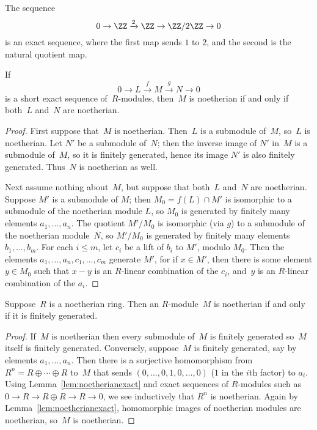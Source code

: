 \begin{example}
  The sequence
  \[
    0 \to \ZZ \xrightarrow{2} \ZZ\rightarrow \ZZ/2\ZZ \to 0
  \]
  is an exact sequence, where the first map sends $1$ to $2$,
  and the second is the natural quotient map.
\end{example}


\begin{lemma}\label{lem:noetherianexact}
  If
  \[
    0 \to L \xrightarrow{f} M \xrightarrow{g} N \to 0
  \]
  is a short exact sequence of~$R$-modules, then~$M$ is noetherian
  if and only if both~$L$ and~$N$ are noetherian.
\end{lemma}
\begin{proof}
  First suppose that~$M$ is noetherian.  Then~$L$ is a submodule
  of~$M$, so~$L$ is noetherian.  Let $N'$ be a submodule of~$N$;
  then the inverse image of $N'$ in~$M$ is a submodule of~$M$,
  so it is finitely generated, hence its image $N'$ is also finitely
  generated.  Thus~$N$ is noetherian as well.

  Next assume nothing about~$M$, but suppose that both~$L$ and~$N$ are
  noetherian.  Suppose $M'$ is a submodule of $M$; then $M_0=f(L)\cap M'$
  is isomorphic to a submodule of the noetherian module $L$, so $M_0$ is
  generated by finitely many elements $a_1,\dots, a_n$.  The quotient
  $M'/M_0$ is isomorphic (via $g$) to a submodule of the noetherian
  module~$N$, so $M'/M_0$ is generated by finitely many elements
  $b_1,\dots, b_m$. For each $i\leq m$, let $c_i$ be a lift of $b_i$ to
  $M'$, modulo $M_0$.  Then the elements $a_1,\dots, a_n, c_1,\dots,c_m$
  generate $M'$, for if $x\in M'$, then there is some element
  $y\in M_0$ such that $x-y$ is an $R$-linear combination of the $c_i$,
  and~$y$ is an $R$-linear combination of the $a_i$.
\end{proof}


\begin{proposition}
  \label{prop:noethfg}
  Suppose~$R$ is a noetherian ring.  Then an $R$-module~$M$ is
  noetherian if and only if it is finitely generated.
\end{proposition}
\begin{proof}
  If~$M$ is noetherian then every submodule of~$M$ is finitely generated
  so~$M$ itself is finitely generated.  Conversely, suppose~$M$ is
  finitely generated, say by elements $a_1,\dots, a_n$.  Then there is a
  surjective homomorphism from $R^n=R\oplus \cdots \oplus R$ to~$M$ that
  sends $(0,\dots,0,1,0,\dots,0)$ ($1$ in the $i$th factor) to $a_i$.
  Using Lemma~\ref{lem:noetherianexact} and exact sequences of
  $R$-modules such as $0\to R\to R\oplus R\to R\to 0$, we see
  inductively that $R^n$ is noetherian.  Again by
  Lemma~\ref{lem:noetherianexact}, homomorphic images of noetherian
  modules are noetherian, so~$M$ is noetherian.
\end{proof}

